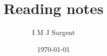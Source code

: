 \documentclass[a4paper]{article} %
\title{\textbf{Reading notes}}
\author{I M J Sargent}
\date{\today} %
\begin{document}

\maketitle %


\begin{refsection}
\renewcommand*{\mkbibcompletename}[1]{%
  \ifitemannotation{highlight}
    {\textbf{#1}}
    {#1}}


\end{refsection}
\end{document}
